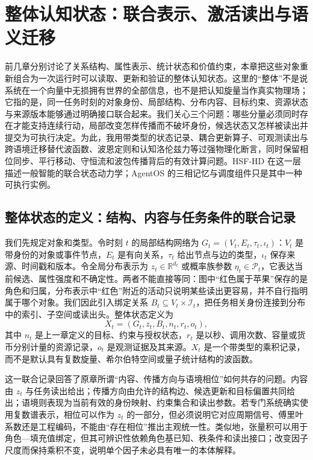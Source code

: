\chapter{整体认知状态：联合表示、激活读出与语义迁移}
\label{chp:holistic_state}

前几章分别讨论了关系结构、属性表示、统计状态和价值约束，本章把这些对象重新组合为一次运行时可以读取、更新和验证的整体认知状态。这里的“整体”不是说系统在一个向量中无损拥有世界的全部信息，也不是把认知旋量当作真实物理场；它指的是，同一任务时刻的对象身份、局部结构、分布内容、目标约束、资源状态与来源版本能够通过明确接口联合起来。我们关心三个问题：哪些分量必须同时存在才能支持连续行动，局部改变怎样传播而不破坏身份，候选状态又怎样被读出并提交为可执行决定。为此，我用带类型的状态记录、耦合更新算子、可观测读出与跨语境迁移替代波函数、波恩定则和认知洛伦兹力等过强物理化断言，同时保留相位同步、平行移动、守恒流和波包传播背后的有效计算问题。HSF-HD 在这一层描述一般智能的联合状态动力学；AgentOS 的三相记忆与调度组件只是其中一种可执行实例。

\section{整体状态的定义：结构、内容与任务条件的联合记录}
\label{sec:definition_of_state}

我们先规定对象和类型。令时刻 $t$ 的局部结构网络为 $G_t=(V_t,E_t,\tau_t,\iota_t)$：$V_t$ 是带身份的对象或事件节点，$E_t$ 是有向关系，$\tau_t$ 给出节点与边的类型，$\iota_t$ 保存来源、时间戳和版本。令全局分布表示为 $z_t\in\mathbb R^{d_t}$ 或概率族参数 $\eta_t\in\mathcal P_t$，它表达当前候选、属性强度和不确定性。两者不能直接等同：图中“红色属于苹果”保存的是角色和归属，分布表示中“红色”附近的活动只说明某些读出更容易，并不自行指明属于哪个对象。我们因此引入绑定关系 $B_t\subseteq V_t\times\mathcal I_t$，把任务相关身份连接到分布中的索引、子空间或读出头。整体状态定义为
\begin{equation}
 X_t=(G_t,z_t,B_t,n_t,r_t,o_t),
\end{equation}
其中 $n_t$ 是上一章定义的目标、约束与授权状态，$r_t$ 是以秒、调用次数、容量或货币分别计量的资源记录，$o_t$ 是观测证据及其来源。$X_t$ 是一个带类型的乘积记录，而不是默认具有复数旋量、希尔伯特空间或量子统计结构的波函数。

这一联合记录回答了原章所谓“内容、传播方向与语境相位”如何共存的问题。内容由 $z_t$ 与任务读出给出；传播方向由允许的结构边、候选更新和目标偏置共同给出；语境则表现为当前有效的身份映射、约束集合和读出参数。若专门系统确实使用复数谱表示，相位可以作为 $z_t$ 的一部分，但必须说明它对应周期信号、傅里叶系数还是工程编码，不能由“存在相位”推出主观统一性。类似地，张量积可以用于角色—填充值绑定，但其可辨识性依赖角色基已知、秩条件和读出接口；改变因子尺度而保持乘积不变，说明单个因子未必具有唯一的本体解释。

